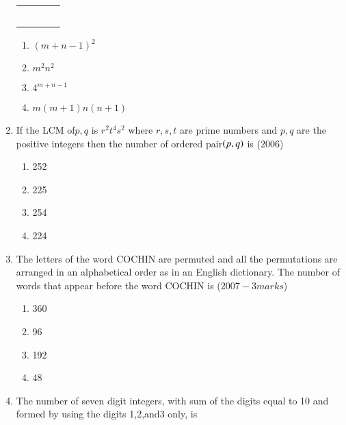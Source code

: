 \documentclass[journal,12pt,twocolumn]{IEEEtran}
\theoremstyle{remark}
\begin{document}
\begin{enumerate}[start=3]
\begin{center}
\begin{tabular}{|c|c|c|c|}
\hline
\quad&\quad&\quad&\quad\\
\hline
\quad&\quad&\quad&\quad\\
\hline
\quad&\quad&\quad&\quad\\
\hline\quad&\quad&\quad&\quad\\
\hline\quad&\quad&\quad&\quad\\
\hline\quad&\quad&\quad&\quad\\
\hline
\end{tabular}
\end{center}
\begin{multicols}{2} 
\begin{enumerate}
\item  $(m+n-1)^2$
\item  $m^2n^2$\columnbreak\item  $4^{m+n-1}$\item $m(m+1)n(n+1)$
\end{enumerate}
\end{multicols}
\item If the LCM of$p,q$ is $r^2t^4s^2$ where $r,s,t$ are prime numbers and $p,q$ are the positive integers then the number of ordered pair$\left(p,q\right)$ is \hfill{($2006$)}\\
\begin{multicols}{2} 
\begin{enumerate}
\item  252\item  225\columnbreak\item  254\item  224
\end{enumerate}
\end{multicols}
\item The letters of the word COCHIN are permuted and all the permutations are arranged in an alphabetical order as in an English dictionary. The number of words that appear before the word COCHIN is
\hfill{($2007-3 marks$)}\\
\begin{multicols}{2} 
\begin{enumerate}
\item  360\item  96\columnbreak\item 192\item  48
\end{enumerate}
\end{multicols}
\item The number of seven digit integers, with sum of the digits equal to 10 and formed by using the digits 1,2,and3 only, is

\end{enumerate}
\end{document}
